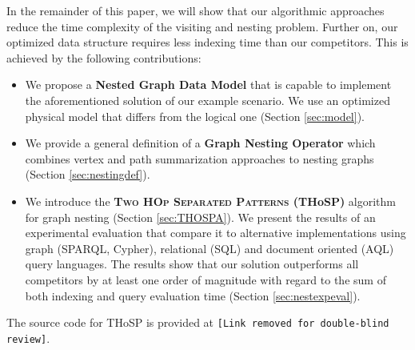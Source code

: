 In the remainder of this paper, we will show that our algorithmic approaches reduce the time complexity of the visiting and nesting problem. Further on, our optimized data structure requires less indexing time than our competitors. This is achieved by the following contributions:

\begin{itemize}
	\item We propose a \textbf{Nested Graph Data Model} that is capable to implement the aforementioned solution of our example scenario. We use an optimized physical model that differs from the logical one (Section \ref{sec:model}).

	\item We provide  a general definition of a \textbf{Graph Nesting Operator} which combines vertex and path summarization approaches to nesting graphs (Section \ref{sec:nestingdef}).
	\item We introduce the  \textbf{\textsc{{Two HOp Separated Patterns}} (THoSP)} algorithm for graph nesting (Section \ref{sec:THOSPA}). We present the results of an experimental evaluation that compare it to alternative implementations using graph (SPARQL, Cypher), relational (SQL) and document oriented (AQL) query languages. The results show that our solution outperforms all competitors by at least one order of magnitude with regard to the sum of both indexing and query evaluation time (Section \ref{sec:nestexpeval}).

\end{itemize}

The source code for THoSP is provided at \texttt{\color{red}[Link removed for double-blind review]}.
